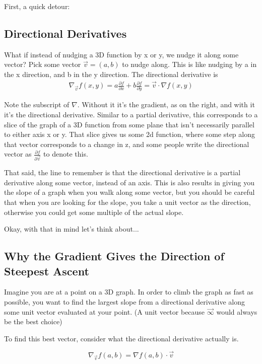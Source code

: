 \documentclass[12pt, letterpaper]{article}
\begin{document}
First, a quick detour:

\subsection{Directional Derivatives}
What if instead of nudging a 3D function by x or y, we nudge it along some vector?
Pick some vector $\vec{v} = (a, b)$ to nudge along. This is like nudging by a in the x direction, and b in the y direction.
The directional derivative is
\begin{gather*}
    {\nabla}_{\vec{v}} f(x, y) 
    = a\frac{\partial f}{\partial x} + b\frac{\partial f}{\partial y} 
    = \vec{v} \cdot \nabla f(x, y)
\end{gather*}

Note the subscript of $\nabla$. Without it it's the gradient, as on the right, and with it it's the directional derivative.
Similar to a partial derivative, this corresponds to a slice of the graph of a 3D function from some plane that isn't necessarily parallel to either axis x or y.
That slice gives us some 2d function, where some step along that vector corresponds to a change in z, and some people write the directional vector as \Large $\frac{\partial f}{\partial \vec{v}}$ \normalsize to denote this.

That said, the line to remember is that the directional derivative is a partial derivative along some vector, instead of an axis. This is also results in giving you the slope of a graph when you walk along some vector, but you should be careful that when you are looking for the slope, you take a unit vector as the direction, otherwise you could get some multiple of the actual slope. 

Okay, with that in mind let's think about...

\subsection{Why the Gradient Gives the Direction of Steepest Ascent}

Imagine you are at a point on a 3D graph. In order to climb the graph as fast as possible, you want to find the largest slope from a directional derivative along some unit vector evaluated at your point. (A unit vector because $\vec{\infty}$ would always be the best choice)

To find this best vector, consider what the directional derivative actually is.

\begin{displaymath}
    \nabla_{\vec{v}} f(a, b) = \nabla f(a, b) \cdot \vec{v}
\end{displaymath}
\end{document}
